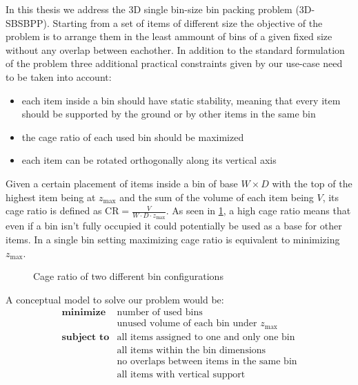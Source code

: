 In this thesis we address the 3D single bin-size bin packing problem (3D-SBSBPP). Starting from a set of items of different size the objective of the problem is to arrange them in the least ammount of bins of a given fixed size without any overlap between eachother.
In addition to the standard formulation of the problem three additional practical constraints given by our use-case need to be taken into account:
\begin{itemize}
    \item each item inside a bin should have static stability, meaning that every item should be supported by the ground or by other items in the same bin
    \item the cage ratio of each used bin should be maximized
    \item each item can be rotated orthogonally along its vertical axis
\end{itemize}

Given a certain placement of items inside a bin of base $W \times D$ with the top of the highest item being at $z_\text{max}$ and the sum of the volume of each item being $V$, its cage ratio is defined as $\text{CR} = \frac{V}{W \cdot D \cdot z_\text{max}}$.
As seen in \cref{fig:cage_ratio}, a high cage ratio means that even if a bin isn't fully occupied it could potentially be used as a base for other items. In a single bin setting maximizing cage ratio is equivalent to minimizing $z_\text{max}$.

\begin{figure}
    \scalebox{0.65}{%
    
    }
    \caption{Cage ratio of two different bin configurations}
    \label{fig:cage_ratio}
\end{figure}

A conceptual model to solve our problem would be:
\begin{eqnarray*}
    \textbf{minimize} & \text{number of used bins} \\
                        & \text{unused volume of each bin under $z_\text{max}$} \\
    \textbf{subject to} & \text{all items assigned to one and only one bin} \\
                                      & \text{all items within the bin dimensions} \\
                                      & \text{no overlaps between items in the same bin} \\
                                      & \text{all items with vertical support} \\
\end{eqnarray*}

